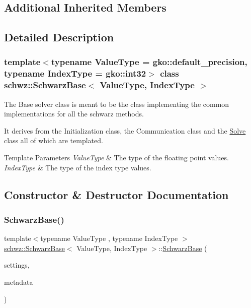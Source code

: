 \subsection*{Additional Inherited Members}


\subsection{Detailed Description}
\subsubsection*{template$<$typename Value\+Type = gko\+::default\+\_\+precision, typename Index\+Type = gko\+::int32$>$\newline
class schwz\+::\+Schwarz\+Base$<$ Value\+Type, Index\+Type $>$}

The Base solver class is meant to be the class implementing the common implementations for all the schwarz methods. 

It derives from the Initialization class, the Communication class and the \hyperlink{classschwz_1_1Solve}{Solve} class all of which are templated.


\begin{DoxyTemplParams}{Template Parameters}
{\em Value\+Type} & The type of the floating point values. \\
\hline
{\em Index\+Type} & The type of the index type values. \\
\hline
\end{DoxyTemplParams}


\subsection{Constructor \& Destructor Documentation}
\mbox{\label{classschwz_1_1SchwarzBase_ab746eb6bb1c40d110ebd03cef0ddb415}} 
\subsubsection{\texorpdfstring{Schwarz\+Base()}{SchwarzBase()}}
{\footnotesize\ttfamily template$<$typename Value\+Type , typename Index\+Type $>$ \\
\hyperlink{classschwz_1_1SchwarzBase}{schwz\+::\+Schwarz\+Base}$<$ Value\+Type, Index\+Type $>$\+::\hyperlink{classschwz_1_1SchwarzBase}{Schwarz\+Base} (\begin{DoxyParamCaption}\item[{\hyperlink{structschwz_1_1Settings}{Settings} \&}]{settings,  }\item[{\hyperlink{structschwz_1_1Metadata}{Metadata}$<$ Value\+Type, Index\+Type $>$ \&}]{metadata }\end{DoxyParamCaption})}



